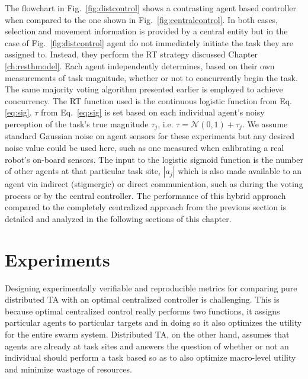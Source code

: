 \documentclass[12pt]{book}
\begin{document}
The flowchart in Fig.~\ref{fig:distcontrol} shows a contrasting agent based controller when compared to the one shown in Fig.~\ref{fig:centralcontrol}. In both cases, selection and movement information is provided by a central entity but in the case of Fig.~\ref{fig:distcontrol} agent do not immediately initiate the task they are assigned to. Instead, they perform the RT strategy discussed Chapter \ref{ch:resthmodel}. Each agent independently determines, based on their own measurements of task magnitude, whether or not to concurrently begin the task. The same majority voting algorithm presented earlier is employed to achieve concurrency. The RT function used is the continuous logistic function from Eq.\ref{eq:sig}. $\tau$ from Eq.~\ref{eq:sig} is set based on each individual agent's noisy perception of the task's true magnitude $\tau_j$, i.e. $\tau = \mathcal{N}(0,1) + \tau_j$. We assume standard Gaussian noise on agent sensors for these experiments but any desired noise value could be used here, such as one measured when calibrating  a real robot's on-board sensors. The input to the logistic sigmoid function is the number of other agents at that particular task site, $|a_j|$ which is also made available to an agent via indirect (stigmergic) or direct communication, such as during the voting process or by the central controller. The performance of this hybrid approach compared to the completely centralized approach from the previous section is detailed and analyzed in the following sections of this chapter.

\section{Experiments}
Designing experimentally verifiable and reproducible metrics for comparing pure distributed TA with an optimal centralized controller is challenging. This is because optimal centralized control really performs two functions, it assigns particular agents to particular targets and in doing so it also optimizes the utility for the entire swarm system. Distributed TA, on the other hand, assumes that agents are already at task sites and answers the question of whether or not an individual should perform a task based so as to also optimize macro-level utility and minimize wastage of resources.
\end{document}
